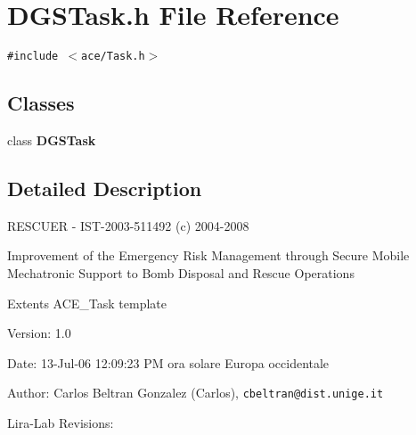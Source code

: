 \section{DGSTask.h File Reference}
\label{DGSTask_8h}
{\tt \#include $<$ace/Task.h$>$}\par
\subsection*{Classes}
\begin{CompactItemize}
\item 
class {\bf DGSTask}
\end{CompactItemize}


\subsection{Detailed Description}
RESCUER - IST-2003-511492 (c) 2004-2008

Improvement of the Emergency Risk Management through Secure Mobile Mechatronic Support to Bomb Disposal and Rescue Operations

Extents ACE\_\-Task template \begin{Desc}
\item[Version:]1.0 \end{Desc}
\begin{Desc}
\item[Date:]13-Jul-06 12:09:23 PM ora solare Europa occidentale \end{Desc}
\begin{Desc}
\item[Author:]Carlos Beltran Gonzalez (Carlos), {\tt cbeltran@dist.unige.it} 

Lira-Lab Revisions:\end{Desc}

